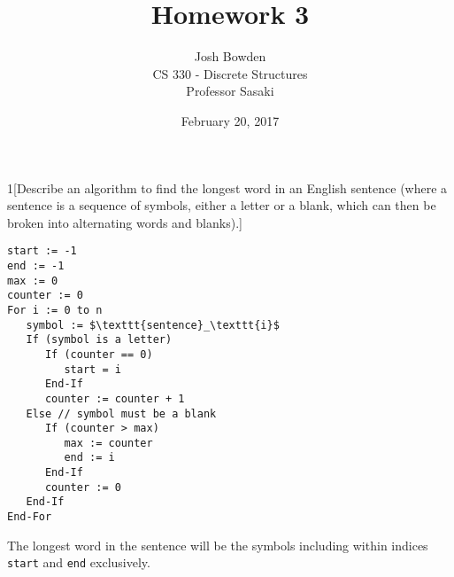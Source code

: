 \documentclass{homework}
\begin{document}
\title{Homework 3}
\author{Josh Bowden\vspace*{8pt}\\
CS 330 - Discrete Structures\\
Professor Sasaki}

\date{February 20, 2017}

\maketitle



\begin{problem}{1}[Describe an algorithm to find the longest word in an English sentence (where a sentence is a sequence of symbols, either a letter or a blank, which can then be broken into alternating words and blanks).]

\begin{lstlisting}
start := -1
end := -1
max := 0
counter := 0
For i := 0 to n
   symbol := $\texttt{sentence}_\texttt{i}$
   If (symbol is a letter)
      If (counter == 0)
         start = i
      End-If 
      counter := counter + 1
   Else // symbol must be a blank
      If (counter > max)
         max := counter
         end := i
      End-If
      counter := 0
   End-If
End-For
\end{lstlisting}

The longest word in the sentence will be the symbols including within indices \texttt{start} and \texttt{end} exclusively.
\end{problem}

\end{document}
